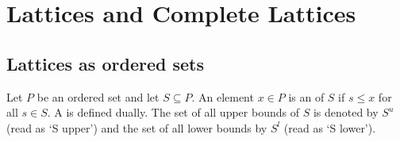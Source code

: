 \documentclass{myproc}
\begin{document}
\section{Lattices and Complete Lattices}
\subsection{Lattices as ordered sets}
\bit
\w Let $P$ be an ordered set and let $S \subseteq P$. An element $x \in P$ is
an  of $S$ if $s \le x$ for all $s \in S$.
A  is defined dually.
\w The set of all upper bounds of $S$ is denoted by $S^u$ (read as `S upper')
and the set of all lower bounds by $S^l$ (read as `S lower').
\eit



\nocite{DP02,Birkhoff67}
\end{document}
